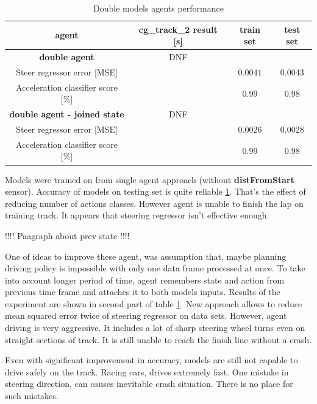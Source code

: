 \documentclass[declaration,shortabstract,english,inz]{iithesis}
\begin{document}
\begin{table}[h]
    \centering
    \begin{tabular}{ |c|c|c|c|}
          \hline
          agent & cg\_track\_2 result [s] & train set & test set \\
          \hline
          \textbf{double agent} & DNF &   &  \\
          \hline
          Steer regressor error [MSE]&   & $0.0041$ & $0.0043$\\
          \hline
          Acceleration classifier score [\%]&  & $0.99$ & $0.98$ \\
          \hline
          \textbf{double agent - joined state} & DNF &   &  \\
          \hline
          Steer regressor error [MSE]&   & $0.0026$ & $0.0028$\\
          \hline
          Acceleration classifier score [\%]&  & $0.99$ & $0.98$ \\
          \hline
          
        \end{tabular}
        \caption{Double models agents performance}
        \label{tab:double_models_results}

\end{table}


Models were trained on from single agent approach (without \textbf{distFromStart} sensor). Accuracy of models on testing set is quite reliable \ref{tab:double_models_results}. That's the effect of reducing number of actions classes. However agent is unable to finish the lap on training track. It appears that steering regressor isn't effective enough. 

!!!! Paagraph about prev state !!!!

One of ideas to improve these agent, was assumption that, maybe planning driving policy is impossible with only one data frame processed at once. To take into account longer period of time, agent remembers state and action from previous time frame and attaches it to both models inputs. Results of the experiment are shown in second part of table \ref{tab:double_models_results}. New approach allows to reduce mean squared error twice of steering regressor on data sets. However, agent driving is very aggressive. It includes a lot of sharp steering wheel turns even on straight sections of track. It is still unable to reach the finish line without a crash.

Even with significant improvement in accuracy, models are still not capable to drive safely on the track. Racing cars, drives extremely fast. One mistake in steering direction, can causes inevitable crash situation. There is no place for such mistakes.  
\end{document}

